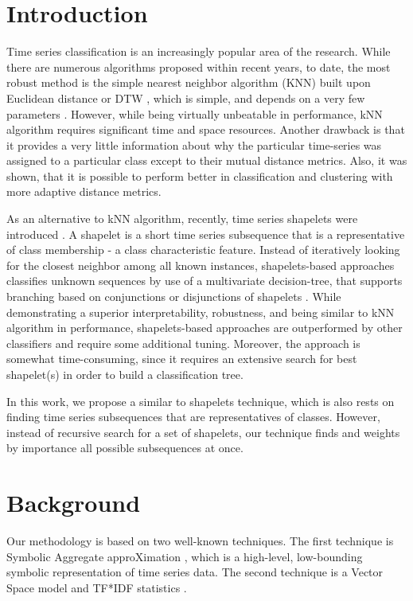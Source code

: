 \documentclass{llncs}
\begin{document}
\section{Introduction}
%
Time series classification is an increasingly popular area of the research. While there are numerous
algorithms proposed within recent years, to date, the most robust method is the simple nearest
neighbor algorithm (KNN) built upon Euclidean distance or DTW \cite{1NN}, which is simple, and
depends on a very few parameters \cite{ed}.
However, while being virtually unbeatable in performance, kNN algorithm requires significant time
and space resources. Another drawback is that it provides a very little information about why the
particular time-series was assigned to a particular class except to their mutual distance metrics.
Also, it was shown, that it is possible to perform better in classification and clustering with more
adaptive distance metrics.

As an alternative to kNN algorithm, recently, time series shapelets were introduced \cite{shapelet}.
A shapelet is a short time series subsequence that is a representative of class membership - a class
characteristic feature. Instead of iteratively looking for the closest neighbor among all known
instances, shapelets-based approaches classifies unknown sequences by use of a multivariate
decision-tree, that supports branching based on conjunctions or disjunctions of shapelets
\cite{logical}. 
While demonstrating a superior interpretability, robustness, and being similar to kNN algorithm
in performance, shapelets-based approaches are outperformed by other classifiers
and require some additional tuning. Moreover, the approach is somewhat time-consuming,  since it
requires an extensive search for best shapelet(s) in order to build a classification tree.

In this work, we propose a similar to shapelets technique, which is also rests on finding time
series subsequences that are representatives of classes. However, instead of recursive search for a
set of shapelets, our technique finds and weights by importance all possible subsequences at once.

\section{Background}
Our methodology is based on two well-known techniques. The first technique is Symbolic Aggregate
approXimation \cite{sax}, which is a high-level, low-bounding symbolic representation of time series
data. The second technique is a Vector Space model and TF*IDF statistics \cite{salton}.
\end{document}
